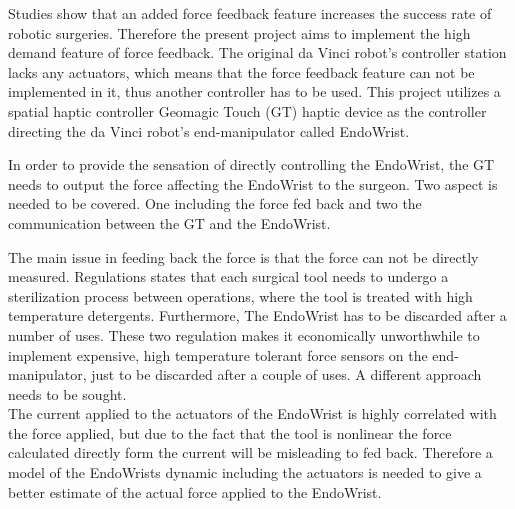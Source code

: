 Studies show that an added force feedback feature increases the success rate of robotic surgeries\cite{lack_fb}. Therefore the present project aims to implement the high demand feature of force feedback. The original da Vinci robot's controller station lacks any actuators, which means that the force feedback feature can not be implemented in it, thus another controller has to be used. This project utilizes a spatial haptic controller Geomagic Touch (GT) haptic device as the controller directing the da Vinci robot's end-manipulator called EndoWrist. 







In order to provide the sensation of directly controlling the EndoWrist, the GT needs to output the force affecting the EndoWrist to the surgeon. Two aspect is needed to be covered. One including the force fed back and two the communication between the GT and the EndoWrist. 

The main issue in feeding back the force is that the force can not be directly measured. Regulations states that each surgical tool needs to undergo a sterilization process between operations, where the tool is treated with high temperature detergents. Furthermore, The EndoWrist has to be discarded after a number of uses\cite{catalog_davinci}. These two regulation makes it economically unworthwhile to implement expensive, high temperature tolerant force sensors on the end-manipulator, just to be discarded after a couple of uses. A different approach needs to be sought.\\
The current applied to the actuators of the EndoWrist is highly correlated with the force applied, but due to the fact that the tool is nonlinear the force calculated directly form the current will be misleading to fed back. Therefore a model of the EndoWrists dynamic including the actuators is needed to give a better estimate of the actual force applied to the EndoWrist.



